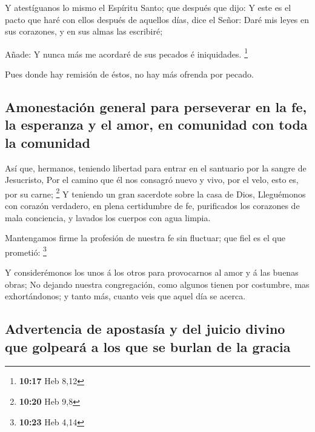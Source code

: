  Y atestíguanos lo mismo el Espíritu Santo; que después que
dijo:  Y este es el pacto que haré con ellos después de
aquellos días, dice el Señor: Daré mis leyes en sus corazones, y en sus
almas las escribiré;

 Añade: Y nunca más me acordaré de sus pecados é
iniquidades. \footnote{\textbf{10:17} Heb 8,12}

 Pues donde hay remisión de éstos, no hay más ofrenda por
pecado.

\hypertarget{amonestaciuxf3n-general-para-perseverar-en-la-fe-la-esperanza-y-el-amor-en-comunidad-con-toda-la-comunidad}{%
\subsection{Amonestación general para perseverar en la fe, la esperanza
y el amor, en comunidad con toda la
comunidad}\label{amonestaciuxf3n-general-para-perseverar-en-la-fe-la-esperanza-y-el-amor-en-comunidad-con-toda-la-comunidad}}

 Así que, hermanos, teniendo libertad para entrar en el
santuario por la sangre de Jesucristo,  Por el camino que
él nos consagró nuevo y vivo, por el velo, esto es, por su carne;
\footnote{\textbf{10:20} Heb 9,8}  Y teniendo un gran
sacerdote sobre la casa de Dios,  Lleguémonos con corazón
verdadero, en plena certidumbre de fe, purificados los corazones de mala
conciencia, y lavados los cuerpos con agua limpia.

 Mantengamos firme la profesión de nuestra fe sin fluctuar;
que fiel es el que prometió: \footnote{\textbf{10:23} Heb 4,14}

 Y considerémonos los unos á los otros para provocarnos al
amor y á las buenas obras;  No dejando nuestra
congregación, como algunos tienen por costumbre, mas exhortándonos; y
tanto más, cuanto veis que aquel día se acerca.

\hypertarget{advertencia-de-apostasuxeda-y-del-juicio-divino-que-golpearuxe1-a-los-que-se-burlan-de-la-gracia}{%
\subsection{Advertencia de apostasía y del juicio divino que golpeará a
los que se burlan de la
gracia}\label{advertencia-de-apostasuxeda-y-del-juicio-divino-que-golpearuxe1-a-los-que-se-burlan-de-la-gracia}}

